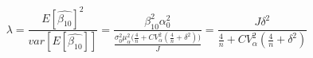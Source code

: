 \begin{equation}
\label{eq:lambda}
\lambda = \frac{E[\hat{\beta_{10}}]^2}{var[E[\hat{\beta_{10}}]]} = \frac{\beta_{10}^2\alpha_0^2}{\frac{\sigma_0^2\mu_{\alpha}^2\Big(\frac{4}{n} + CV_{\alpha}^2(\frac{4}{n} + \delta^2)\Big)}{J}} = \frac{J\delta^2}{\frac{4}{n}+CV_{\alpha}^2(\frac{4}{n} + \delta^2)}
\end{equation}